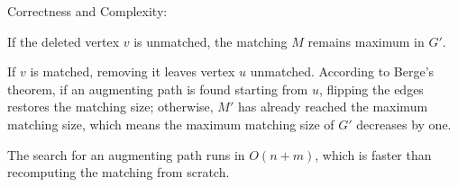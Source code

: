 \documentclass[11pt]{article}
\begin{document}
\begin{description}
Correctness and Complexity:

If the deleted vertex \(v\) is unmatched, the matching \(M\) remains maximum in \(G'\). 

If \(v\) is matched, removing it leaves vertex \(u\) unmatched. According to Berge's theorem, if an augmenting path is found starting from \(u\), flipping the edges restores the matching size; 
otherwise, $M'$ has already reached the maximum matching size, which means the maximum matching size of \(G'\) decreases by one.

The search for an augmenting path runs in \(O(n+m)\), which is faster than recomputing the matching from scratch.

\end{description}
\end{document}
